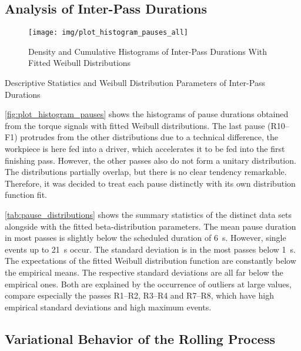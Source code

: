 \subsection{Analysis of Inter-Pass Durations}\label{subsec:analysis-of-inter-pass-durations}

\begin{figure}
    \centering
    \texttt{[image: img/plot\_histogram\_pauses\_all]}
    \caption{Density and Cumulative Histograms of Inter-Pass Durations With Fitted Weibull Distributions}
    \label{fig:plot_histogram_pauses}
\end{figure}

\begin{table}
    \centering
    \caption{Descriptive Statistics and Weibull Distribution Parameters of Inter-Pass Durations}
    \label{tab:pause_distributions}
    
\end{table}


\autoref{fig:plot_histogram_pauses} shows the histograms of pause durations obtained from the torque signals with fitted Weibull distributions.
The last pause (R10--F1) protrudes from the other distributions due to a technical difference, the workpiece is here fed into a driver, which accelerates it to be fed into the first finishing pass.
However, the other passes also do not form a unitary distribution.
The distributions partially overlap, but there is no clear tendency remarkable.
Therefore, it was decided to treat each pause distinctly with its own distribution function fit.

\autoref{tab:pause_distributions} shows the summary statistics of the distinct data sets alongside with the fitted beta-distribution parameters.
The mean pause duration in most passes is slightly below the scheduled duration of \qty{6}{\second}.
However, single events up to \qty{21}{\second} occur.
The standard deviation is in the most passes below \qty{1}{\second}.
The expectations of the fitted Weibull distribution function are constantly below the empirical means.
The respective standard deviations are all far below the empirical ones.
Both are explained by the occurrence of outliers at large values, compare especially the passes R1--R2, R3--R4 and R7--R8, which have high empirical standard deviations and high maximum events.

\subsection{Variational Behavior of the Rolling Process}\label{subsec:variational-behavior-of-the-rolling-process}

